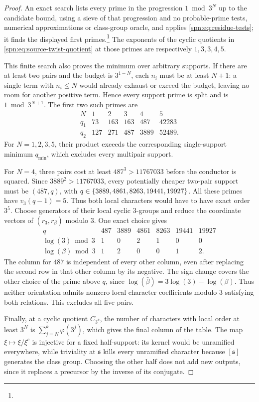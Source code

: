 \begin{proof}
An exact search lists every prime in the progression $1\bmod3^N$ up to the
candidate bound, using a sieve of that progression and no probable-prime
tests, numerical approximations or class-group oracle, and applies
\eqref{spn:eq:residue-tests}; it finds the displayed first
primes.\footnote{}
The exponents of the cyclic quotients in
\eqref{spn:eq:source-twist-quotient} at those primes are respectively
$1,3,3,4,5$.

This finite search also proves the minimum over arbitrary supports. If there
are at least two pairs and the budget is $3^{1-N}$, each $n_i$ must be at
least $N+1$: a single term with $n_i\le N$ would already exhaust or exceed
the budget, leaving no room for another positive term. Hence every support
prime is split and is $1\bmod3^{N+1}$. The first two such primes are
\[
\begin{array}{c|rrrrr}
N&1&2&3&4&5\\ \hline
q_1&73&163&163&487&42283\\
q_2&127&271&487&3889&52489.
\end{array}
\]
For $N=1,2,3,5$, their product exceeds the corresponding single-support
minimum $q_{\min}$, which excludes every multipair support.

For $N=4$, three pairs cost at least $487^3>11767033$ before the conductor is
squared. Since $3889^2>11767033$, every potentially cheaper two-pair support
must be $(487,q)$, with $q\in\{3889,4861,8263,19441,19927\}$. All these
primes have $v_3(q-1)=5$. Thus both local characters would have to have exact
order $3^5$. Choose generators of their local cyclic $3$-groups and reduce
the coordinate vectors of $(r_3,r_\beta)$ modulo $3$. One exact choice gives
\[
\begin{array}{c|rrrrrr}
q&487&3889&4861&8263&19441&19927\\ \hline
\log(3)\bmod3&1&0&2&1&0&0\\
\log(\beta)\bmod3&1&2&0&0&1&2.
\end{array}
\]
The column for $487$ is independent of every other column, even after
replacing the second row in that other column by its negative. The sign
change covers the other choice of the prime above $q$, since
$\log(\bar\beta)=3\log(3)-\log(\beta)$. Thus neither orientation admits
nonzero local character coefficients modulo $3$ satisfying both relations.
This excludes all five pairs.

Finally, at a cyclic quotient $C_{3^k}$, the number of characters with local
order at least $3^N$ is $\sum_{j=N}^{k}\varphi(3^j)$, which gives the final
column of the table. The map $\xi\mapsto\xi/\xi^c$ is injective for a fixed
half-support: its kernel would be unramified everywhere, while triviality at
$\mathfrak s$ kills every unramified character because $[\mathfrak s]$
generates the class group. Choosing the other half does not add new outputs,
since it replaces a precursor by the inverse of its conjugate.
\end{proof}

